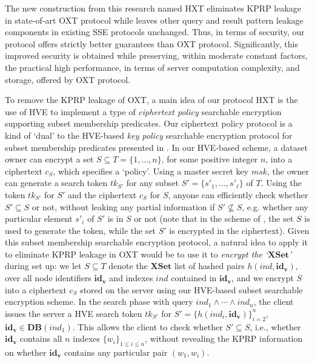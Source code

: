 The new construction from this research named HXT eliminates KPRP leakage in state-of-art OXT protocol while leaves other query and result pattern leakage components in existing SSE protocols unchanged. Thus, in terms of security, our protocol offers strictly better guarantees than OXT protocol. Significantly, this improved security is obtained while preserving, within moderate constant factors, the practical high performance, in terms of server computation complexity, and storage, offered by OXT protocol.

To remove the KPRP leakage of OXT, a main idea of our protocol HXT is the use of HVE to implement a type of \emph{ciphertext policy} searchable encryption supporting subset membership predicates. Our ciphertext policy protocol is a kind of `dual' to the HVE-based \emph{key policy} searchable encryption protocol for subset membership predicates presented in \cite{boneh2007conjunctive}. In our HVE-based scheme, a dataset owner can encrypt a set $S \subseteq T=\{1,\ldots,n\}$, for some positive integer $n$, into a ciphertext $c_S$, which specifies a `policy'. Using a master secret key $msk$, the owner can generate a search token $tk_{S'}$ for any subset $S' = \{s'_1,\ldots,s'_\ell\}$ of $T$. Using the token $tk_{S'}$ for $S'$ and the ciphertext $c_S$ for $S$, anyone can efficiently check whether $S' \subseteq S$ or not, without leaking any partial information if $S' \not\subseteq S$, e.g. whether any particular element $s'_i$ of $S'$ is in $S$ or not (note that in the scheme of \cite{boneh2007conjunctive}, the set $S$ is used to generate the token, while the set $S'$ is encrypted in the ciphertext). 
Given this subset membership searchable encryption protocol, a natural idea to apply it to eliminate KPRP leakage in OXT would be to use it to \emph{encrypt the `$\mathbf{XSet}$'} during set up: we let $S \subseteq T$ denote the $\mathbf{XSet}$ list of hashed pairs $h(ind, \mathbf{id_v})$, over all node identifiers $\mathbf{id_v}$ and indexes $ind$ contained in $\mathbf{id_v}$, and we encrypt $S$ into a ciphertext $c_S$ stored on the server using our HVE-based subset searchable encryption scheme. In the search phase with query $ind_1 \wedge \cdots \wedge ind_n$, the client issues the server a HVE search token $tk_{S'}$ for $S' = \{h(ind_i, \mathbf{id_v})\}_{i=2}^n$, $\mathbf{id_v} \in \mathbf{DB}(ind_1)$. This allows the client to check whether $S'\subseteq S$, i.e., whether $\mathbf{id_v}$ contains all $n$ indexes $\{w_i\}_{1\leq i\leq n}$, without revealing the KPRP information on whether $\mathbf{id_v}$ contains any particular pair $(w_1,w_i)$.

